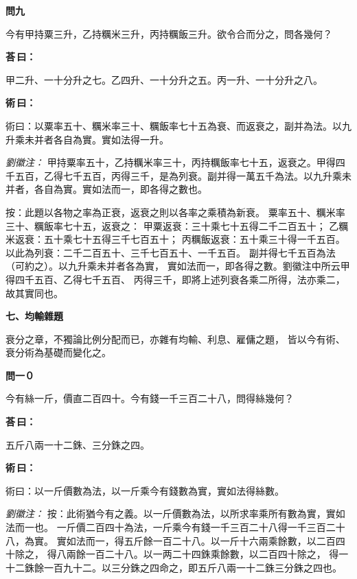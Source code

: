 \documentclass[11pt,a4paper]{article}
\newenvironment{problem}[1][]{%
  \par\vspace{0.6em}\noindent\textcolor{problemcolor}{\textbf{問\ignorespaces#1\unskip}\hspace{0.5em}}%
  \ignorespaces
}{\par\vspace{0.4em}}
\newenvironment{answer}{%
  \par\noindent\textcolor{answercolor}{\textbf{荅\,曰：}}%
  \ignorespaces
}{\par\vspace{0.3em}}
\newenvironment{method}{%
  \par\noindent\textcolor{methodcolor}{\textbf{術\,曰：}}%
  \ignorespaces
}{\par\vspace{0.4em}}
\newenvironment{liuhuicomm}{%
  \par\vspace{0.3em}\noindent\textcolor{commentarycolor}{\small\textit{劉徽注：}}}%
  {\par\vspace{0.5em}}
\begin{document}
\begin{problem}[九]
今有甲持粟三升，乙持糲米三升，丙持糲飯三升。欲令合而分之，問各幾何？
\end{problem}

\begin{answer}
甲二升、一十分升之七。乙四升、一十分升之五。丙一升、一十分升之八。
\end{answer}

\begin{method}
術曰：以粟率五十、糲米率三十、糲飯率七十五為衰、而返衰之，副并為法。以九升乘未并者各自為實。實如法得一升。
\end{method}

\begin{liuhuicomm}
甲持粟率五十，乙持糲米率三十，丙持糲飯率七十五，返衰之。甲得四千五百，乙得七千五百，丙得三千，是為列衰。副并得一萬五千為法。以九升乘未并者，各自為實。實如法而一，即各得之數也。

按：此題以各物之率為正衰，返衰之則以各率之乘積為新衰。
粟率五十、糲米率三十、糲飯率七十五，返衰之：
甲粟返衰：三十乘七十五得二千二百五十；
乙糲米返衰：五十乘七十五得三千七百五十；
丙糲飯返衰：五十乘三十得一千五百。
以此為列衰：二千二百五十、三千七百五十、一千五百。
副并得七千五百為法（可約之）。以九升乘未并者各為實，
實如法而一，即各得之數。劉徽注中所云甲得四千五百、乙得七千五百、
丙得三千，即將上述列衰各乘二所得，法亦乘二，故其實同也。
\end{liuhuicomm}

\vspace{0.8em}
\noindent\textbf{\large 七、均輸雜題}
\vspace{0.5em}

\noindent 衰分之章，不獨論比例分配而已，亦雜有均輸、利息、雇傭之題，
皆以今有術、衰分術為基礎而變化之。

\begin{problem}[一０]
今有絲一斤，價直二百四十。今有錢一千三百二十八，問得絲幾何？
\end{problem}

\begin{answer}
五斤八兩一十二銖、三分銖之四。
\end{answer}

\begin{method}
術曰：以一斤價數為法，以一斤乘今有錢數為實，實如法得絲數。
\end{method}

\begin{liuhuicomm}
按：此術猶今有之義。以一斤價數為法，以所求率乘所有數為實，實如法而一也。
一斤價二百四十為法，一斤乘今有錢一千三百二十八得一千三百二十八，為實。
實如法而一，得五斤餘一百二十八。以一斤十六兩乘餘數，以二百四十除之，
得八兩餘一百二十八。以一两二十四銖乘餘數，以二百四十除之，
得一十二銖餘一百九十二。以三分銖之四命之，即五斤八兩一十二銖三分銖之四也。
\end{liuhuicomm}
\end{document}
